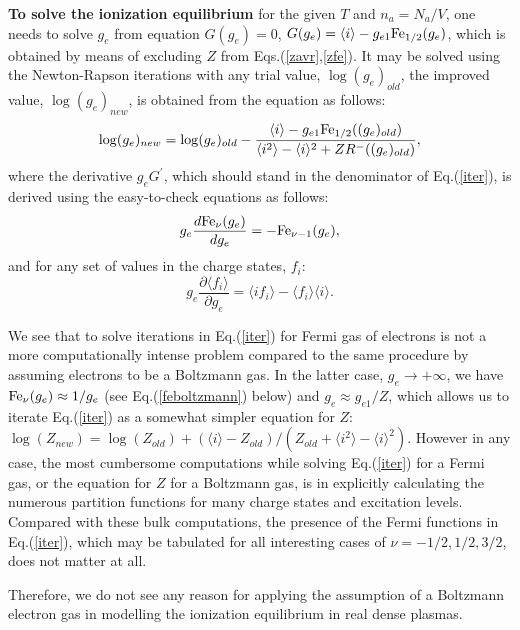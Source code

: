 {\bf To solve the ionization equilibrium} for the given $T$ and $n_a=N_a/V$, one needs to solve $g_e$ from equation $G(g_e)=0$, 
$G(g_e)=\langle i\rangle-g_{e1}{\rm Fe}_{1/2}(g_e)$, which is obtained by means of excluding $Z$ from Eqs.(\ref{zavr},\ref{zfe}). 
It may be solved using the Newton-Rapson iterations with any trial value, $\log(g_e)_{old}$, the improved value, $\log(g_e)_{new}$, 
is obtained from the equation as follows:
\begin{equation}\label{iter}
\log(g_e)_{new}=%
\log(g_e)_{old}-\frac{\langle i\rangle-g_{e1}{\rm Fe}_{1/2}((g_e)_{old})}{
\langle i^2\rangle-\langle i\rangle^2+ Z R^-((g_e)_{old}) },
\end{equation}
where the derivative $g_eG^\prime$, which should stand in the denominator of 
Eq.(\ref{iter}), is derived using the easy-to-check equations as follows:
\begin{equation}
g_e\frac{d{\rm Fe}_\nu(g_e)}{dg_e}=-{\rm Fe}_{\nu-1}(g_e),
\end{equation}
and for any set of values in the charge states, $f_i$:
\begin{equation}
g_e\frac{\partial\langle f_i\rangle}{\partial g_e}=\langle if_i\rangle-\langle f_i\rangle\langle i\rangle.
\end{equation}

We see that to solve iterations in Eq.(\ref{iter}) for Fermi gas of electrons is not a
more computationally intense problem compared to the same procedure by assuming electrons 
to be a Boltzmann gas. In the latter case, $g_e \to +\infty$, we have ${\rm Fe}_\nu(g_e) \approx 1/g_e$
(see Eq.(\ref{feboltzmann}) below) and $g_e \approx g_{e1}/Z$, which allows us to iterate Eq.(\ref{iter})
as a somewhat simpler equation for $Z$:
$\log (Z_{new})=\log(Z_{old})+(\langle i\rangle-Z_{old})/(Z_{old}+\langle i^2\rangle-\langle i\rangle^2)$. However in any case, the most cumbersome computations 
while solving Eq.(\ref{iter}) for a Fermi gas, or the equation for $Z$ for a Boltzmann gas, is in explicitly calculating the 
numerous partition functions for many charge
states and excitation levels. Compared with these bulk computations, the presence of the Fermi functions in Eq.(\ref{iter}), which may be tabulated 
for all interesting cases of $\nu=-1/2,1/2,3/2$, %
does not matter at all.

Therefore, we 
do not see any reason for applying the assumption of a Boltzmann electron gas in modelling the ionization equilibrium
in real dense plasmas.

